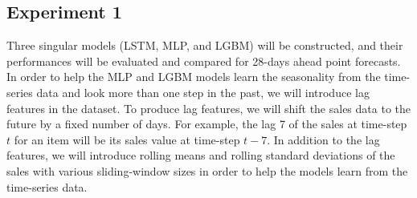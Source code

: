 \subsection*{Experiment 1}
Three singular models (LSTM, MLP, and LGBM) will be constructed, and their performances will be evaluated and compared for 28-days ahead point forecasts. 
In order to help the MLP and LGBM models learn the seasonality from the time-series data and look more than one step in the past, we will introduce lag features in the dataset. 
To produce lag features, we will shift the sales data to the future by a fixed number of days. 
For example, the lag 7 of the sales at time-step \(t\) for an item will be its sales value at time-step \(t-7\). 
In addition to the lag features, we will introduce rolling means and rolling standard deviations of the sales with various sliding-window sizes in order to help the models learn from the time-series data.

